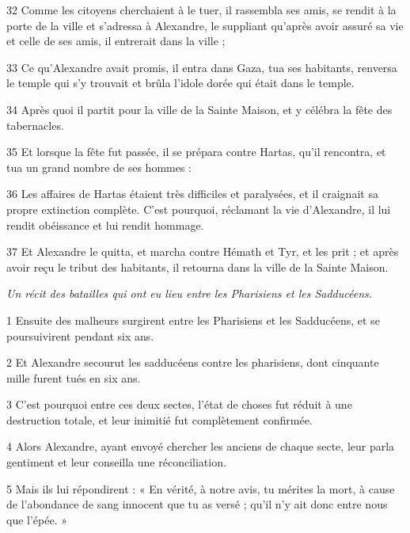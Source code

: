 \par 32 Comme les citoyens cherchaient à le tuer, il rassembla ses amis, se rendit à la porte de la ville et s'adressa à Alexandre, le suppliant qu'après avoir assuré sa vie et celle de ses amis, il entrerait dans la ville ;

\par 33 Ce qu'Alexandre avait promis, il entra dans Gaza, tua ses habitants, renversa le temple qui s'y trouvait et brûla l'idole dorée qui était dans le temple.

\par 34 Après quoi il partit pour la ville de la Sainte Maison, et y célébra la fête des tabernacles.

\par 35 Et lorsque la fête fut passée, il se prépara contre Hartas, qu'il rencontra, et tua un grand nombre de ses hommes :

\par 36 Les affaires de Hartas étaient très difficiles et paralysées, et il craignait sa propre extinction complète. C'est pourquoi, réclamant la vie d'Alexandre, il lui rendit obéissance et lui rendit hommage.

\par 37 Et Alexandre le quitta, et marcha contre Hémath et Tyr, et les prit ; et après avoir reçu le tribut des habitants, il retourna dans la ville de la Sainte Maison.


\par \textit{Un récit des batailles qui ont eu lieu entre les Pharisiens et les Sadducéens.}

\par 1 Ensuite des malheurs surgirent entre les Pharisiens et les Sadducéens, et se poursuivirent pendant six ans.

\par 2 Et Alexandre secourut les sadducéens contre les pharisiens, dont cinquante mille furent tués en six ans.

\par 3 C'est pourquoi entre ces deux sectes, l'état de choses fut réduit à une destruction totale, et leur inimitié fut complètement confirmée.

\par 4 Alors Alexandre, ayant envoyé chercher les anciens de chaque secte, leur parla gentiment et leur conseilla une réconciliation.

\par 5 Mais ils lui répondirent : « En vérité, à notre avis, tu mérites la mort, à cause de l'abondance de sang innocent que tu as versé ; qu'il n'y ait donc entre nous que l'épée. »

